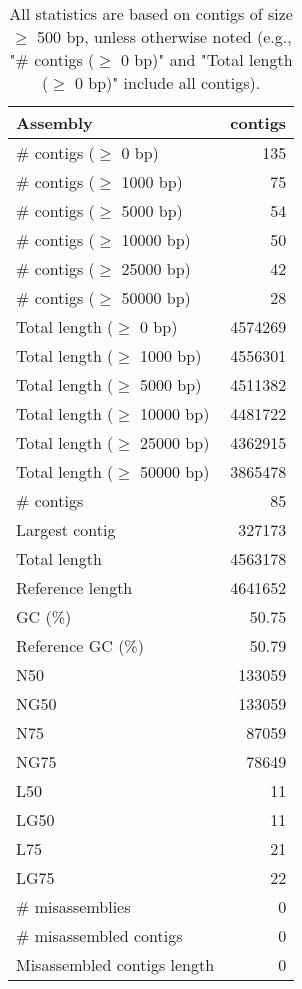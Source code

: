 \documentclass[12pt,a4paper]{article}
\begin{document}
\begin{table}[ht]
\begin{center}
\caption{All statistics are based on contigs of size $\geq$ 500 bp, unless otherwise noted (e.g., "\# contigs ($\geq$ 0 bp)" and "Total length ($\geq$ 0 bp)" include all contigs).}
\begin{tabular}{|l*{1}{|r}|}
\hline
Assembly & contigs \\ \hline
\# contigs ($\geq$ 0 bp) & 135 \\ \hline
\# contigs ($\geq$ 1000 bp) & 75 \\ \hline
\# contigs ($\geq$ 5000 bp) & 54 \\ \hline
\# contigs ($\geq$ 10000 bp) & 50 \\ \hline
\# contigs ($\geq$ 25000 bp) & 42 \\ \hline
\# contigs ($\geq$ 50000 bp) & 28 \\ \hline
Total length ($\geq$ 0 bp) & 4574269 \\ \hline
Total length ($\geq$ 1000 bp) & 4556301 \\ \hline
Total length ($\geq$ 5000 bp) & 4511382 \\ \hline
Total length ($\geq$ 10000 bp) & 4481722 \\ \hline
Total length ($\geq$ 25000 bp) & 4362915 \\ \hline
Total length ($\geq$ 50000 bp) & 3865478 \\ \hline
\# contigs & 85 \\ \hline
Largest contig & 327173 \\ \hline
Total length & 4563178 \\ \hline
Reference length & 4641652 \\ \hline
GC (\%) & 50.75 \\ \hline
Reference GC (\%) & 50.79 \\ \hline
N50 & 133059 \\ \hline
NG50 & 133059 \\ \hline
N75 & 87059 \\ \hline
NG75 & 78649 \\ \hline
L50 & 11 \\ \hline
LG50 & 11 \\ \hline
L75 & 21 \\ \hline
LG75 & 22 \\ \hline
\# misassemblies & 0 \\ \hline
\# misassembled contigs & 0 \\ \hline
Misassembled contigs length & 0 \\ \hline

\end{tabular}
\end{center}
\end{table}
\end{document}
